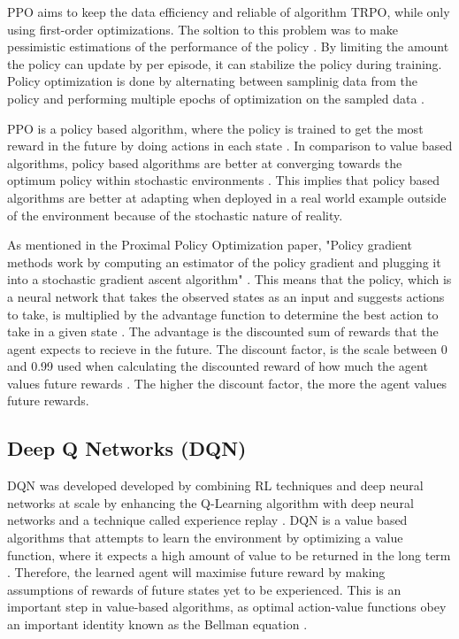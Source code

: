 PPO aims to keep the data efficiency and reliable of algorithm TRPO, while only using first-order optimizations. The soltion to this problem was to make pessimistic estimations of the performance of the policy \cite{schulman2017proximal}. By limiting the amount the policy can update by per episode, it can stabilize the policy during training. Policy optimization is done by alternating between samplinig data from the policy and performing multiple epochs of optimization on the sampled data \cite{schulman2017proximal}. 

PPO is a policy based algorithm, where the policy is trained to get the most reward in the future by doing actions in each state \cite{deepcheckRL}. In comparison to value based algorithms, policy based algorithms are better at converging towards the optimum policy within stochastic environments \cite{mnih2015human}. This implies that policy based algorithms are better at adapting when deployed in a real world example outside of the environment because of the stochastic nature of reality. 

As mentioned in the Proximal Policy Optimization paper, "Policy gradient methods work by computing an estimator of the policy gradient and plugging it into a stochastic gradient ascent algorithm" \cite{schulman2017proximal}. This means that the policy, which is a neural network that takes the observed states as an input and suggests actions to take, is multiplied by the advantage function to determine the best action to take in a given state \cite{schulman2017proximal}. The advantage is the discounted sum of rewards that the agent expects to recieve in the future. The discount factor, is the scale between 0 and 0.99 used when calculating the discounted reward of how much the agent values future rewards \cite{XanderSteenbrugge2019ppo}. The higher the discount factor, the more the agent values future rewards. 

\subsection{Deep Q Networks (DQN)}

DQN was developed developed by combining RL techniques and deep neural networks at scale by enhancing the Q-Learning algorithm with deep neural networks and a technique called experience replay \cite{TFAgentsAuthors2023}. DQN is a value based algorithms that attempts to learn the environment by optimizing a value function, where it expects a high amount of value to be returned in the long term \cite{deepcheckRL}. Therefore, the learned agent will maximise future reward by making assumptions of rewards of future states yet to be experienced. This is an important step in value-based algorithms, as optimal action-value functions obey an important identity known as the Bellman equation \cite{mnih2013playing}. 

